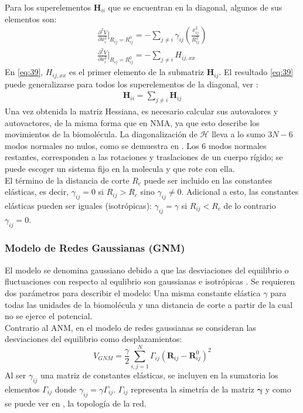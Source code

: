 Para los superelementos $\mathbf{H}_{ii}$ que se encuentran en la diagonal, algunos de sus elementos son:
\begin{eqnarray}\label{eq:39}
\frac{\partial^2 V }{\partial x_i^2}\bigg|_{R_{ij}=R_{ij}^0}=-\sum_{j\neq i}\gamma_{ij}\left(\frac{x_{ij}^2}{R_{ij}^2}\right) \nonumber \\
\frac{\partial^2 V }{\partial x_i^2}\bigg|_{R_{ij}=R_{ij}^0}=-\sum_{j\neq i} H_{ij,xx}
\end{eqnarray}
En \eqref{eq:39}, $H_{ij,xx}$ es el primer elemento de la submatriz $\mathbf{H}_{ij}$. El resultado \eqref{eq:39} puede generalizarse para todos los superelementos de la diagonal, ver \cite{Lezon2009}:
\begin{eqnarray}\label{eq:40}
\mathbf{H}_{ii}=\sum_{j\neq i}\mathbf{H}_{ij}
\end{eqnarray}
Una vez obtenida la matriz Hessiana, es necesario calcular sus autovalores y autovactores, de la misma forma que en NMA, ya que esto describe los movimientos de la biomol\'{e}cula. La diagonalizaci\'{o}n de $\mathcal{H}$ lleva a lo sumo $3N-6$ modos normales no nulos, como se demuestra en \cite{Tirion1996}. Los 6 modos normales restantes, corresponden a las rotaciones y traslaciones de un cuerpo r\'{i}gido; se puede escoger un sistema fijo en la molecula y que rote con ella.\\

El t\'{e}rmino de la distancia de corte $R_c$ puede ser incluido en las constantes el\'{a}sticas, es decir, $\gamma_{ij}=0$ si  $R_{ij}>R_c$ sino $\gamma_{ij}\neq 0$. Adicional a esto, las constantes el\'{a}sticas pueden ser iguales (isotr\'{o}picas): $\gamma_{ij}=\gamma$ si  $R_{ij}<R_c$ de lo contrario  $\gamma_{ij}=0$.
\subsubsection{Modelo de Redes Gaussianas (GNM)}
El modelo se denomina gaussiano debido a que las desviaciones del equilibrio o fluctuaciones con respecto al equlibrio son gaussianas e isotr\'{o}picas \cite{Rader2006}. Se requieren dos par\'{a}metros para describir el modelo: Una misma constante el\'{a}stica $\gamma$ para todas las unidades de la biomol\'{e}cula y una distancia de corte a partir de la cual no se ejerce el potencial.\\
Contrario al ANM, en el modelo de redes gaussianas se consideran las desviaciones del equilibrio como desplazamientos:
\begin{equation}\label{eq:27}
V_{GNM}=\frac{\gamma}{2}\sum_{i,j=1}^{N}\Gamma_{ij}\left(\textbf{R}_{ij}-\textbf{R}_{ij}^0\right)^2
\end{equation}
Al ser $\gamma_{ij}$ una matriz de constantes el\'{a}sticas, se incluyen en la sumatoria los elementos $\Gamma_{ij}$ donde $\gamma_{ij}=\gamma\Gamma_{ij}$. $\Gamma_{ij}$ representa la simetr\'{i}a de la matriz $ \mathbf{\gamma}$ y como se puede ver en \cite{Rader2006}, la topolog\'{i}a de la red.\\


